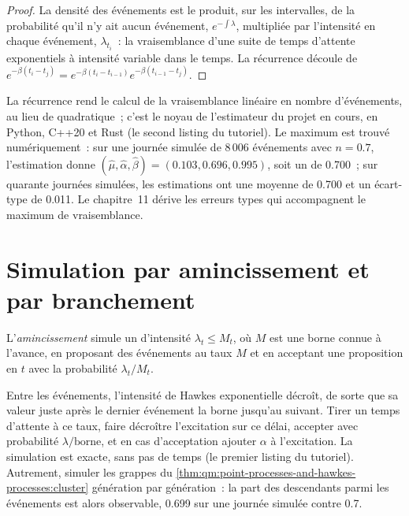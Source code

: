 \begin{proof}
La densité des événements est le produit, sur les intervalles, de la probabilité qu'il n'y ait aucun événement, $e^{-\int\lambda}$,
multipliée par l'intensité en chaque événement, $\lambda_{t_i}$~: la vraisemblance d'une suite de temps d'attente exponentiels
à intensité variable dans le temps. La récurrence découle de $e^{-\beta(t_i - t_j)} = e^{-\beta(t_i - t_{i-1})}e^{-\beta(t_{i-1} - t_j)}$.
\end{proof}

La récurrence rend le calcul de la vraisemblance linéaire en nombre d'événements, au lieu de quadratique~; c'est le
noyau de l'estimateur du projet en cours, en Python, C++20 et Rust (le
second listing du tutoriel). Le maximum est trouvé numériquement~: sur une
journée simulée de 8\,006 événements avec $n = 0.7$, l'estimation donne $(\hat\mu, \hat\alpha, \hat\beta) = (0.103, 0.696, 0.995)$,
soit un  de 0.700~; sur quarante journées simulées, les estimations ont une moyenne de 0.700 et un écart-type
de 0.011. Le chapitre~11 dérive les erreurs types qui accompagnent le maximum de vraisemblance.

\section{Simulation par amincissement et par branchement}

\begin{definition}[Amincissement]\label{def:qm:point-processes-and-hawkes-processes:thinning}
L'\emph{amincissement} simule un  d'intensité $\lambda_t \le M_t$, où $M$ est une borne connue
à l'avance, en proposant des événements au taux $M$ et en acceptant une proposition en $t$ avec la probabilité $\lambda_t/M_t$.
\end{definition}

\begin{method}\label{met:qm:point-processes-and-hawkes-processes:ogata}
Entre les événements, l'intensité de Hawkes exponentielle décroît, de sorte que sa valeur juste après le dernier événement la borne
jusqu'au suivant. Tirer un temps d'attente à ce taux, faire décroître l'excitation sur ce délai, accepter avec probabilité
$\lambda/\text{borne}$, et en cas d'acceptation ajouter $\alpha$ à l'excitation. La simulation est exacte, sans pas de temps (le
premier listing du tutoriel). Autrement, simuler les grappes du
\cref{thm:qm:point-processes-and-hawkes-processes:cluster} génération par génération~: la part des descendants
parmi les événements est alors observable, 0.699 sur une journée simulée contre 0.7.
\end{method}

